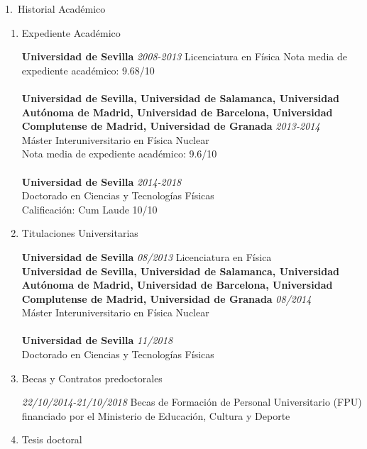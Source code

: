 \documentclass{resume2} %
\begin{document}
\begin{rSection}{1.~Historial Acad\'emico}
\begin{enumerate}[label=\alph*.]
\item Expediente Acad\'emico


{\bf Universidad de Sevilla} \hfill {\em 2008-2013} \newline
Licenciatura en F\'isica \newline
Nota media de expediente acad\'emico: 9.68/10\\
\\
{\bf Universidad de Sevilla, Universidad de Salamanca, Universidad Aut\'onoma de Madrid, Universidad de Barcelona, Universidad Complutense de Madrid, Universidad de Granada} \hfill {\em 2013-2014} \\ 
M\'aster Interuniversitario en F\'isica Nuclear \\
Nota media de expediente acad\'emico: 9.6/10\\
\\
{\bf Universidad de Sevilla} \hfill {\em 2014-2018} \\ 
Doctorado en Ciencias y Tecnolog\'ias F\'isicas \\
Calificaci\'on: Cum Laude 10/10\\

\item Titulaciones Universitarias


{\bf Universidad de Sevilla} \hfill {\em 08/2013} \newline
Licenciatura en F\'isica \newline
\\
{\bf Universidad de Sevilla, Universidad de Salamanca, Universidad Aut\'onoma de Madrid, Universidad de Barcelona, Universidad Complutense de Madrid, Universidad de Granada} \hfill {\em 08/2014} \\ 
M\'aster Interuniversitario en F\'isica Nuclear \\
\\
{\bf Universidad de Sevilla} \hfill {\em 11/2018} \\ 
Doctorado en Ciencias y Tecnolog\'ias F\'isicas \\

\item Becas y Contratos predoctorales

{\em 22/10/2014-21/10/2018} Becas de Formaci\'on de Personal Universitario (FPU) financiado por el Ministerio de Educaci\'on, Cultura y Deporte

\item Tesis doctoral


\end{enumerate}
\end{rSection}
\end{document}
